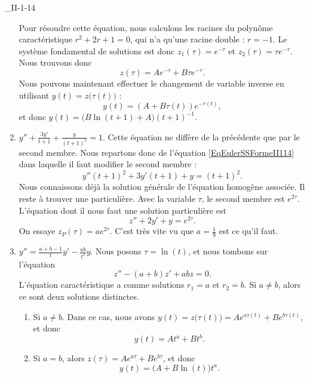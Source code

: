 \begin{corrige}{_II-1-14}
\begin{enumerate}
\begin{equation}
		      \end{equation}
		      Pour résoudre cette équation, nous calculons les racines du polynôme caractéristique $r^2+2r+1=0$, qui n'a qu'une racine double : $r=-1$. Le système fondamental de solutions est donc $z_1(\tau)= e^{-\tau}$ et $z_2(\tau)= \tau e^{-\tau}$. Nous trouvons donc
		      \begin{equation}
			      z(\tau)=A e^{-\tau}+B\tau e^{-\tau}.
		      \end{equation}
		      Nous pouvons maintenant effectuer le changement de variable inverse en utilisant $y(t)=z\big( \tau(t) \big)$ :
		      \begin{equation}
			      y(t)=(A+B\tau(t)) e^{-\tau(t)},
		      \end{equation}
		      et donc $y(t)=\big( B\ln(t+1)+A \big)(t+1)^{-1}$.


		\item
		      $y''+\frac{ 3y' }{ t+1 }+\frac{ y }{ (t+1)^2 }=1$.
		      Cette équation ne diffère de la précédente que par le second membre. Nous repartons donc de l'équation \eqref{EqEulerSSFormeII114} dans laquelle il faut modifier le second membre :
		      \begin{equation}
			      y''(t+1)^2+3y'(t+1)+y=(t+1)^2.
		      \end{equation}
		      Nous connaissons déjà la solution générale de l'équation homogène associée. Il reste à trouver une particulière. Avec la variable $\tau$, le second membre est $ e^{2\tau}$. L'équation dont il nous faut une solution particulière est
		      \begin{equation}
			      z''+2y'+y= e^{2\tau}.
		      \end{equation}
		      On essaye $z_P(\tau)=a e^{2\tau}$. C'est très vite vu que $a=\frac{1}{ 9 }$ est ce qu'il faut.

		\item
		      $y''=\frac{ a+b-1 }{ t }y'-\frac{ ab }{ t^2 }y$.
		      Nous posons $\tau=\ln(t)$, et nous tombons sur l'équation
		      \begin{equation}
			      z''-(a+b)z'+abz=0.
		      \end{equation}
		      L'équation caractéristique a comme solutions $r_1=a$ et $r_2=b$. Si $a\neq b$, alors ce sont deux solutions distinctes.

		      \begin{enumerate}
			      \item Si $a\neq b$. Dans ce cas, nous avons $y(t)=z\big( \tau(t) \big)=A e^{a\tau(t)}+B e^{b\tau(t)}$, et donc
			            \begin{equation}
				            y(t)=At^a+Bt^b.
			            \end{equation}
			      \item Si $a=b$, alors $z(\tau)=A e^{a\tau}+B e^{b\tau}$, et donc
			            \begin{equation}
				            y(t)=\big( A+B\ln(t) \big)t^a.
			            \end{equation}
		      \end{enumerate}


\end{enumerate}
\end{corrige}
